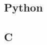 \documentclass[journal=tosc,notanonymous]{iacrtrans}
\begin{document}
\subsection{Python}

\subsection{C}




\end{document}
